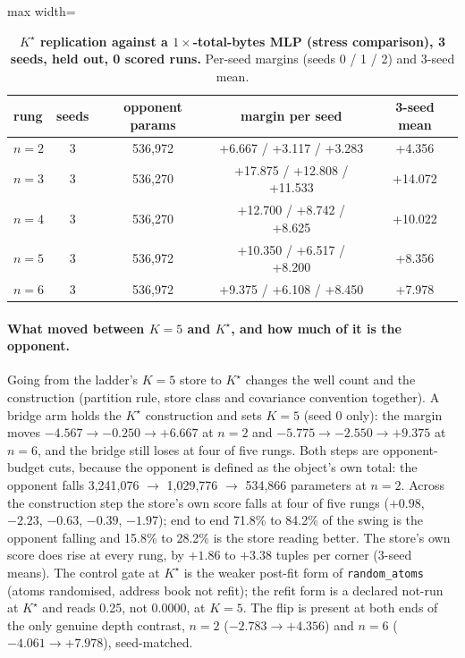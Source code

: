 \documentclass{article} %
\newcommand{\Kstar}{\ensuremath{K^{\star}}}
\begin{document}
\begin{table}[h]
\centering\small
\caption{\textbf{$\Kstar$ replication against a $1\times$-total-bytes MLP (stress comparison),
3 seeds, held out, 0 scored runs.} Per-seed margins (seeds 0 / 1 / 2) and 3-seed mean.}
\label{tab:1x}
\begin{adjustbox}{max width=\linewidth}\begin{tabular}{lcccc}
\toprule
rung & seeds & opponent params & margin per seed & 3-seed mean \\
\midrule
$n=2$ & 3 & 536,972 & +6.667 / +3.117 / +3.283 & +4.356 \\
$n=3$ & 3 & 536,270 & +17.875 / +12.808 / +11.533 & +14.072 \\
$n=4$ & 3 & 536,270 & +12.700 / +8.742 / +8.625 & +10.022 \\
$n=5$ & 3 & 536,972 & +10.350 / +6.517 / +8.200 & +8.356 \\
$n=6$ & 3 & 536,972 & +9.375 / +6.108 / +8.450 & +7.978 \\
\bottomrule
\end{tabular}\end{adjustbox}
\end{table}

\paragraph{What moved between $K=5$ and $\Kstar$, and how much of it is the opponent.} Going from
the ladder's $K=5$ store to $\Kstar$ changes the well count and the construction (partition rule,
store class and covariance convention together). A bridge arm holds the $\Kstar$ construction and
sets $K=5$ (seed 0 only): the margin moves $-4.567\to-0.250\to+6.667$ at $n=2$ and
$-5.775\to-2.550\to+9.375$ at $n=6$, and the bridge still loses at four of five rungs.
Both steps are opponent-budget cuts, because the opponent is defined as the object's own total: the
opponent falls 3,241,076 $\to$ 1,029,776 $\to$ 534,866 parameters at $n=2$. Across the construction
step the store's own score falls at four of five rungs ($+0.98$, $-2.23$, $-0.63$, $-0.39$, $-1.97$);
end to end 71.8\% to 84.2\% of the swing is the opponent falling and 15.8\% to 28.2\% is the store
reading better. %
The store's own score does rise at every rung, by $+1.86$ to $+3.38$ tuples per corner (3-seed
means). %
The control gate at $\Kstar$ is the weaker post-fit form of \texttt{random\_atoms} (atoms
randomised, address book not refit); the refit form is a declared not-run at $\Kstar$ and reads
0.25, not 0.0000, at $K=5$. %
The flip is present at both ends of the only genuine depth contrast, $n=2$ ($-2.783\to+4.356$) and
$n=6$ ($-4.061\to+7.978$), seed-matched. %
\end{document}
